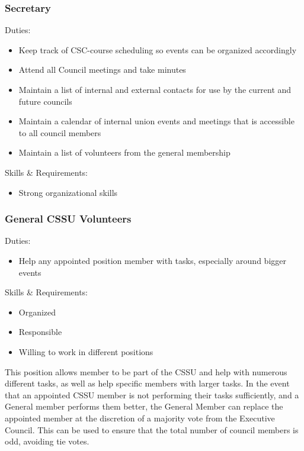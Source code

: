 \documentclass{article}
\begin{document}
\subsubsection{Secretary} \label{sec:2.3.2}
Duties:
\begin{itemize}
    \item Keep track of CSC-course scheduling so events can be organized accordingly
    \item Attend all Council meetings and take minutes
    \item Maintain a list of internal and external contacts for use by the current and future councils
    \item Maintain a calendar of internal union events and meetings that is accessible to all
council members
    \item Maintain a list of volunteers from the general membership
\end{itemize}
Skills & Requirements:
\begin{itemize}
    \item Strong organizational skills
\end{itemize}

\subsubsection{General CSSU Volunteers} \label{sec:2.3.3}
Duties:
\begin{itemize}
    \item Help any appointed position member with tasks, especially around bigger events
\end{itemize}

Skills & Requirements:
\begin{itemize}
    \item Organized
    \item Responsible
    \item Willing to work in different positions
\end{itemize}
This position allows member to be part of the CSSU and help with numerous different tasks, as
well as help specific members with larger tasks. In the event that an appointed CSSU member is
not performing their tasks sufficiently, and a General member performs them better, the General
Member can replace the appointed member at the discretion of a majority vote from the
Executive Council. This can be used to ensure that the total number of council members is odd,
avoiding tie votes.
\end{document}
